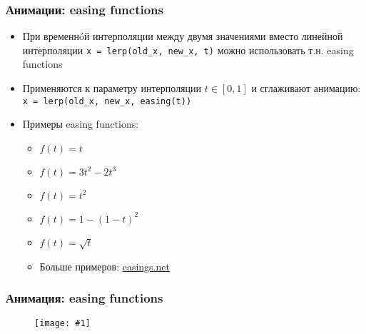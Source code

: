 \documentclass{beamer}
\newcommand{\slideimage}[1]{
  \begin{figure}
    \begin{adjustbox}{width=\textwidth, totalheight=\textheight-2\baselineskip-2\baselineskip,keepaspectratio}
      \texttt{[image: \#1]}
    \end{adjustbox}
  \end{figure}
}
\begin{document}
\begin{frame}[fragile]
\frametitle{Анимации: easing functions}
\begin{itemize}
\item При временнóй интерполяции между двумя значениями вместо линейной интерполяции \verb|x = lerp(old_x, new_x, t)| можно использовать т.н. easing functions
\pause
\item Применяются к параметру интерполяции \begin{math}t \in [0, 1]\end{math} и сглаживают анимацию: \verb|x = lerp(old_x, new_x, easing(t))|
\pause
\item Примеры easing functions:
\begin{itemize}
\item \begin{math}f(t) = t\end{math}
\item \begin{math}f(t) = 3t^2-2t^3\end{math}
\item \begin{math}f(t) = t^2\end{math}
\item \begin{math}f(t) = 1 - (1-t)^2\end{math}
\item \begin{math}f(t) = \sqrt{t}\end{math}
\item Больше примеров: \href{https://easings.net}{easings.net}
\end{itemize}
\end{itemize}
\end{frame}

\begin{frame}[fragile]
\frametitle{Анимация: easing functions}
\slideimage{easing.png}
\end{frame}
\end{document}
